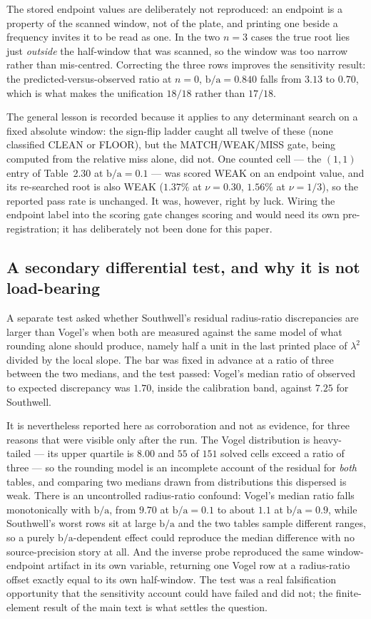 \documentclass[11pt]{article}
\newcommand{\lamsq}{\lambda^{2}}
\newcommand{\ba}{\mbox{b/a}}
\begin{document}
\noindent
The stored endpoint values are deliberately not reproduced: an endpoint is a
property of the scanned window, not of the plate, and printing one beside a
frequency invites it to be read as one. In the two $n=3$ cases the true root
lies just \emph{outside} the half-window that was scanned, so the window was
too narrow rather than mis-centred. Correcting the three rows improves the
sensitivity result: the predicted-versus-observed ratio at $n=0$, $\ba=0.840$
falls from $3.13$ to $0.70$, which is what makes the unification $18/18$
rather than $17/18$.

The general lesson is recorded because it applies to any determinant search on
a fixed absolute window: the sign-flip ladder caught all twelve of these
(none classified CLEAN or FLOOR), but the MATCH/WEAK/MISS gate, being computed
from the relative miss alone, did not. One counted cell --- the $(1,1)$ entry
of Table~2.30 at $\ba=0.1$ --- was scored WEAK on an endpoint value, and its
re-searched root is also WEAK ($1.37\%$ at $\nu=0.30$, $1.56\%$ at
$\nu=1/3$), so the reported pass rate is unchanged. It was, however, right by
luck. Wiring the endpoint label into the scoring gate changes scoring and
would need its own pre-registration; it has deliberately not been done for
this paper.

\subsection{A secondary differential test, and why it is not
load-bearing}\label{sec:sm-inv-vogel}
A separate test asked whether Southwell's residual radius-ratio discrepancies
are larger than Vogel's when both are measured against the same model of
what rounding alone should produce, namely half a unit in the last printed
place of $\lamsq$ divided by the local slope. The bar was fixed in advance at
a ratio of three between the two medians, and the test passed: Vogel's median
ratio of observed to expected discrepancy was $1.70$, inside the calibration
band, against $7.25$ for Southwell.

It is nevertheless reported here as corroboration and not as evidence, for
three reasons that were visible only after the run. The Vogel distribution is
heavy-tailed --- its upper quartile is $8.00$ and $55$ of $151$ solved cells
exceed a ratio of three --- so the rounding model is an incomplete account of
the residual for \emph{both} tables, and comparing two medians drawn from
distributions this dispersed is weak. There is an uncontrolled radius-ratio
confound: Vogel's median ratio falls monotonically with $\ba$, from $9.70$ at
$\ba=0.1$ to about $1.1$ at $\ba=0.9$, while Southwell's worst rows sit at
large $\ba$ and the two tables sample different ranges, so a purely
$\ba$-dependent effect could reproduce the median difference with no
source-precision story at all. And the inverse probe reproduced the same
window-endpoint artifact in its own variable, returning one Vogel row at a
radius-ratio offset exactly equal to its own half-window. The test was a real
falsification opportunity that the sensitivity account could have failed and
did not; the finite-element result of the main text is what settles the
question.
\end{document}
